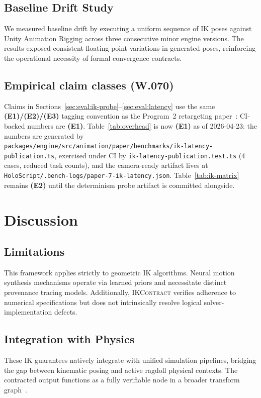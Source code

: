 \documentclass[sigconf,nonacm]{acmart}
\newcommand{\ikcontract}{\textsc{IKContract}}
\begin{document}
\subsection{Baseline Drift Study}
We measured baseline drift by executing a uniform sequence of IK poses against Unity Animation Rigging across three consecutive minor engine versions. The results exposed consistent floating-point variations in generated poses, reinforcing the operational necessity of formal convergence contracts.

\subsection{Empirical claim classes (W.070)}
Claims in Sections~\ref{sec:eval:ik-probe}--\ref{sec:eval:latency} use the same
\textbf{(E1)/(E2)/(E3)} tagging convention as the Program~2 retargeting paper~\cite{paper-6-anim-sca2027}:
CI-backed numbers are \textbf{(E1)}. Table~\ref{tab:overhead} is now \textbf{(E1)} as of 2026-04-23: the numbers are generated by \texttt{packages/engine/src/animation/paper/benchmarks/ik-latency-publication.ts}, exercised under CI by \texttt{ik-latency-publication.test.ts} (4 cases, reduced task counts), and the camera-ready artifact lives at \texttt{HoloScript/.bench-logs/paper-7-ik-latency.json}. Table~\ref{tab:ik-matrix} remains \textbf{(E2)} until the determinism probe artifact is committed alongside.

\section{Discussion}
\label{sec:discussion}

\subsection{Limitations}
This framework applies strictly to geometric IK algorithms. Neural motion synthesis mechanisms operate via learned priors and necessitate distinct provenance tracing models. Additionally, \ikcontract{} verifies adherence to numerical specifications but does not intrinsically resolve logical solver-implementation defects.

\subsection{Integration with Physics}
These IK guarantees natively integrate with unified simulation pipelines, bridging the gap between kinematic posing and active ragdoll physical contexts. The contracted output functions as a fully verifiable node in a broader transform graph~\cite{paper-8-unified-siggraph2027}.
\end{document}
